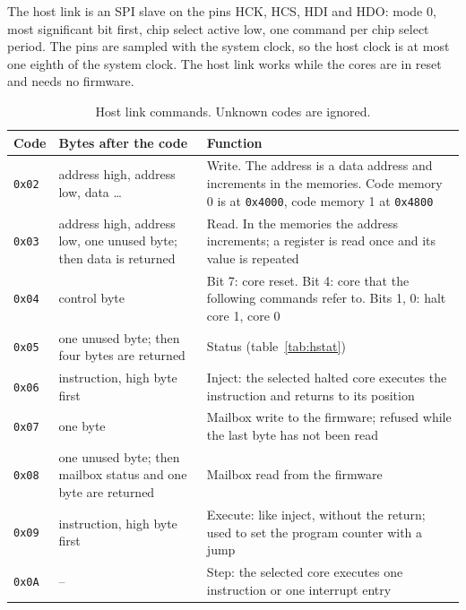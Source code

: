 \documentclass[10pt,a4paper]{article}
\begin{document}
The host link is an SPI slave on the pins HCK, HCS, HDI and HDO: mode 0, most significant bit first, chip
select active low, one command per chip select period. The pins are sampled with the system clock, so the host
clock is at most one eighth of the system clock. The host link works while the cores are in reset and needs no
firmware.

\begin{table}[H]
\centering\small
\begin{tabularx}{\linewidth}{@{}llL@{}}
\toprule
Code & Bytes after the code & Function \\
\midrule
\texttt{0x02} & address high, address low, data \ldots & Write. The address is a data address and increments in the memories. Code memory 0 is at \texttt{0x4000}, code memory 1 at \texttt{0x4800} \\
\texttt{0x03} & address high, address low, one unused byte; then data is returned & Read. In the memories the address increments; a register is read once and its value is repeated \\
\texttt{0x04} & control byte & Bit 7: core reset. Bit 4: core that the following commands refer to. Bits 1, 0: halt core 1, core 0 \\
\texttt{0x05} & one unused byte; then four bytes are returned & Status (table~\ref{tab:hstat}) \\
\texttt{0x06} & instruction, high byte first & Inject: the selected halted core executes the instruction and returns to its position \\
\texttt{0x07} & one byte & Mailbox write to the firmware; refused while the last byte has not been read \\
\texttt{0x08} & one unused byte; then mailbox status and one byte are returned & Mailbox read from the firmware \\
\texttt{0x09} & instruction, high byte first & Execute: like inject, without the return; used to set the program counter with a jump \\
\texttt{0x0A} & -- & Step: the selected core executes one instruction or one interrupt entry \\
\bottomrule
\end{tabularx}
\caption{Host link commands. Unknown codes are ignored.}
\end{table}
\end{document}
